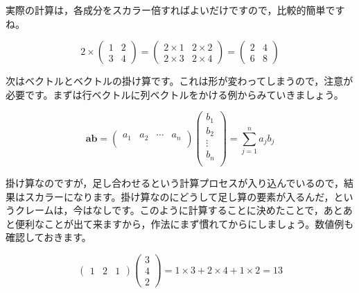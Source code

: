 \documentclass{ltjsbook}
\begin{document}
実際の計算は，各成分をスカラー倍すればよいだけですので，比較的簡単ですね。

\begin{equation*}
    2 \times
    \begin{pmatrix}
    1 & 2 \\
    3 & 4
    \end{pmatrix}
    =
    \begin{pmatrix}
    2 \times 1 & 2 \times 2 \\
    2 \times 3 & 2 \times 4
    \end{pmatrix}
    =
    \begin{pmatrix}
    2 & 4 \\
    6 & 8
    \end{pmatrix}
\end{equation*}


次はベクトルとベクトルの掛け算です。これは形が変わってしまうので，注意が必要です。まずは行ベクトルに列ベクトルをかける例からみていきましょう。

\begin{equation*}
    \bm{a} \bm{b} = 
\begin{pmatrix}
a_1 & a_2 & \cdots & a_n\\
\end{pmatrix}
\begin{pmatrix}
b_1\\
b_2\\
\vdots \\
b_n\\
\end{pmatrix}
=
\sum_{j=1}^{n} a_{j} b_{j}
\end{equation*}


掛け算なのですが，足し合わせるという計算プロセスが入り込んでいるので，結果はスカラーになります。掛け算なのにどうして足し算の要素が入るんだ，というクレームは，今はなしです。このように計算することに決めたことで，あとあと便利なことが出て来ますから，作法にまず慣れてからにしましょう。数値例も確認しておきます。

\begin{equation*}
    \begin{pmatrix}
        1 & 2 & 1
        \end{pmatrix}
        \begin{pmatrix}
        3\\4\\2
        \end{pmatrix}
        =1\times 3 + 2 \times 4 + 1 \times 2 = 13
\end{equation*}
\end{document}
